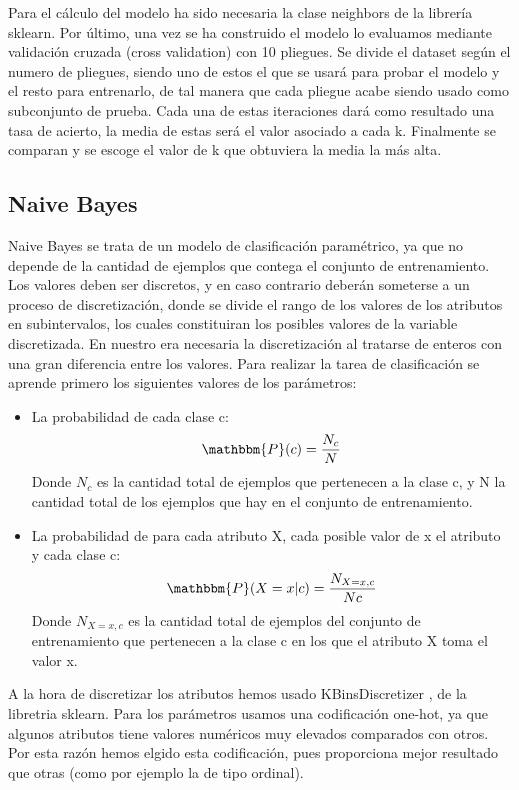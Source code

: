 \documentclass[conference,a4paper]{IEEEtran}
\begin{document}
Para el cálculo del modelo ha sido necesaria la clase neighbors de la librería sklearn.
Por último, una vez se ha construido el modelo lo evaluamos mediante validación cruzada (cross validation) con 10 pliegues. Se divide el dataset según el numero de pliegues, siendo uno de estos el que se usará para probar el modelo y el resto para entrenarlo, de tal manera que cada pliegue acabe siendo usado como subconjunto de prueba. Cada una de estas iteraciones dará como resultado una tasa de acierto, la media de estas será el valor asociado a cada k. Finalmente se comparan y se escoge el valor de k que obtuviera la media la más alta.

\subsection{Naive Bayes}
Naive Bayes se trata de un modelo de clasificación paramétrico, ya que no depende de la cantidad de ejemplos que contega el conjunto de entrenamiento. Los valores deben ser discretos, y en caso contrario deberán someterse a un proceso de discretización, donde se divide el rango de los valores de los atributos en subintervalos, los cuales constituiran los posibles valores de la variable discretizada. En nuestro era necesaria la discretización al tratarse de enteros con una gran diferencia entre los valores.
Para realizar la tarea de clasificación se aprende primero los siguientes valores de los parámetros:
\begin{itemize}
\item La probabilidad de cada clase c:
\begin{equation}
\mathbbm{P}(c) = \frac{ N_{c}}{N}
\end{equation}
Donde $N_{c}$ es la cantidad total de ejemplos que pertenecen a la clase c, y N la cantidad total de los ejemplos que hay en el conjunto de entrenamiento.
\\ 
\item La probabilidad de para cada atributo X, cada posible valor de x el atributo y cada clase c:
\begin{equation}
\mathbbm{P}(X = x | c) = \frac{N_{X=x,c}}{N{c}}
\end{equation}
Donde $N_{X=x,c}$  es la cantidad total de ejemplos del conjunto de entrenamiento que pertenecen a la clase c en los que el atributo X toma el valor x.
\end{itemize}

A la hora de discretizar los atributos hemos usado KBinsDiscretizer \cite{b3}, de la libretria sklearn. Para los parámetros usamos una codificación one-hot, ya que algunos atributos tiene valores numéricos muy elevados comparados con otros. Por esta razón hemos elgido esta codificación, pues proporciona mejor resultado que otras (como por ejemplo la de tipo ordinal).
\end{document}
